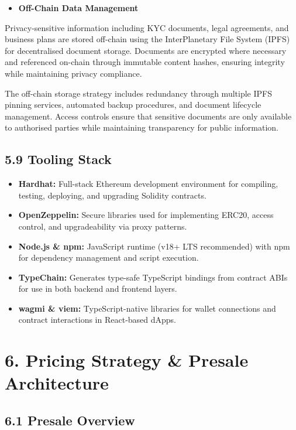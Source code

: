 \documentclass[
  paper=a4,
  ,captions=tableheading
]{scrartcl}
\providecommand{\tightlist}{%
  \setlength{\itemsep}{0pt}\setlength{\parskip}{0pt}}
\begin{document}
\begin{itemize}
\tightlist
\item
  \textbf{Off-Chain Data Management}
\end{itemize}

Privacy-sensitive information including KYC documents, legal agreements,
and business plans are stored off-chain using the InterPlanetary File
System (IPFS) for decentralised document storage. Documents are
encrypted where necessary and referenced on-chain through immutable
content hashes, ensuring integrity while maintaining privacy compliance.

The off-chain storage strategy includes redundancy through multiple IPFS
pinning services, automated backup procedures, and document lifecycle
management. Access controls ensure that sensitive documents are only
available to authorised parties while maintaining transparency for
public information.

\subsection{5.9 Tooling Stack}\label{tooling-stack}

\begin{itemize}
\tightlist
\item
  \textbf{Hardhat:} Full-stack Ethereum development environment for
  compiling, testing, deploying, and upgrading Solidity contracts.
\item
  \textbf{OpenZeppelin:} Secure libraries used for implementing ERC20,
  access control, and upgradeability via proxy patterns.
\item
  \textbf{Node.js \& npm:} JavaScript runtime (v18+ LTS recommended)
  with npm for dependency management and script execution.
\item
  \textbf{TypeChain:} Generates type-safe TypeScript bindings from
  contract ABIs for use in both backend and frontend layers.
\item
  \textbf{wagmi \& viem:} TypeScript-native libraries for wallet
  connections and contract interactions in React-based dApps.
\end{itemize}

\section{6. Pricing Strategy \& Presale Architecture}\label{dual-channel-presale-architecture}

\subsection{6.1 Presale Overview}\label{presale-overview}
\end{document}
